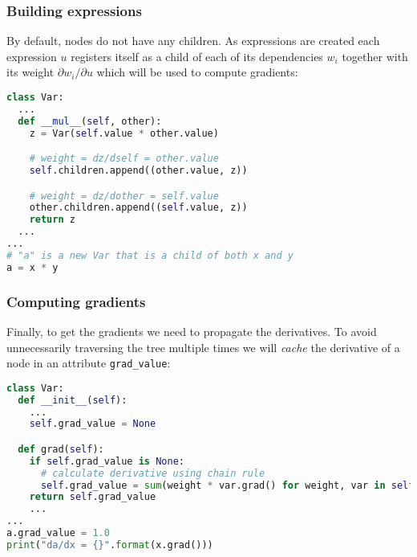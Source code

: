 \documentclass[\beamerclass]{beamer}
\begin{document}
\begin{frame}[fragile]
	\frametitle{Building expressions}

By default, nodes do not have any children. As expressions are created each expression $u$ registers itself as a child of each of its dependencies $w_i$ together with its weight $\partial w_i/\partial u$ which will be used to compute gradients:

\begin{lstlisting}[language=python]
class Var:
  ...
  def __mul__(self, other):
    z = Var(self.value * other.value)

    # weight = dz/dself = other.value
    self.children.append((other.value, z))

    # weight = dz/dother = self.value
    other.children.append((self.value, z))
    return z
  ...
...
# "a" is a new Var that is a child of both x and y
a = x * y
\end{lstlisting}
\end{frame}

\begin{frame}[fragile]
\frametitle{Computing gradients}

Finally, to get the gradients we need to propagate the derivatives. To avoid unnecessarily traversing the tree multiple times we will \emph{cache} the derivative of a node in an attribute \lstinline!grad_value!:
\begin{lstlisting}[language=python,basicstyle=\footnotesize\ttfamily]
class Var:
  def __init__(self):
    ...
    self.grad_value = None

  def grad(self):
    if self.grad_value is None:
      # calculate derivative using chain rule
      self.grad_value = sum(weight * var.grad() for weight, var in self.children)
    return self.grad_value
	...
...
a.grad_value = 1.0
print("da/dx = {}".format(x.grad()))
\end{lstlisting}
\end{frame}

\end{document}
